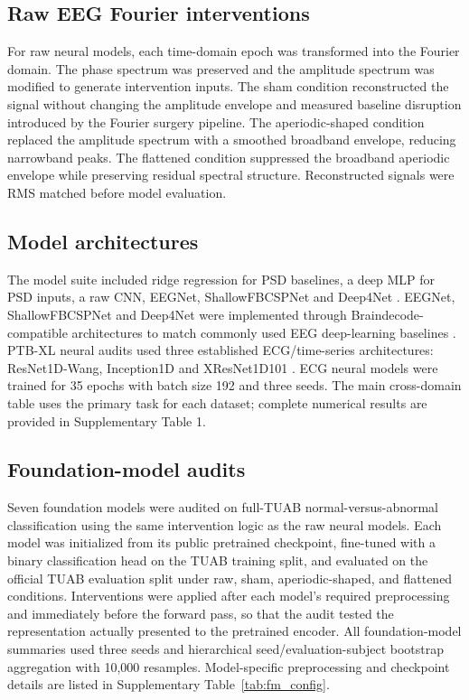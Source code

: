 \documentclass[pdflatex,sn-nature]{sn-jnl}
\begin{document}
\subsection{Raw EEG Fourier interventions}

For raw neural models, each time-domain epoch was transformed into the Fourier domain. The phase spectrum was preserved and the amplitude spectrum was modified to generate intervention inputs. The sham condition reconstructed the signal without changing the amplitude envelope and measured baseline disruption introduced by the Fourier surgery pipeline. The aperiodic-shaped condition replaced the amplitude spectrum with a smoothed broadband envelope, reducing narrowband peaks. The flattened condition suppressed the broadband aperiodic envelope while preserving residual spectral structure. Reconstructed signals were RMS matched before model evaluation.

\subsection{Model architectures}

The model suite included ridge regression for PSD baselines, a deep MLP for PSD inputs, a raw CNN, EEGNet, ShallowFBCSPNet and Deep4Net \cite{pedregosa2011scikit,lawhern2018eegnet,schirrmeister2017deep}. EEGNet, ShallowFBCSPNet and Deep4Net were implemented through Braindecode-compatible architectures to match commonly used EEG deep-learning baselines \cite{schirrmeister2017deep,gemein2020machine}. PTB-XL neural audits used three established ECG/time-series architectures: ResNet1D-Wang, Inception1D and XResNet1D101 \cite{wang2017timeseries,fawaz2020inceptiontime}. ECG neural models were trained for 35 epochs with batch size 192 and three seeds. The main cross-domain table uses the primary task for each dataset; complete numerical results are provided in Supplementary Table 1.

\subsection{Foundation-model audits}

Seven foundation models were audited on full-TUAB normal-versus-abnormal classification using the same intervention logic as the raw neural models. Each model was initialized from its public pretrained checkpoint, fine-tuned with a binary classification head on the TUAB training split, and evaluated on the official TUAB evaluation split under raw, sham, aperiodic-shaped, and flattened conditions. Interventions were applied after each model's required preprocessing and immediately before the forward pass, so that the audit tested the representation actually presented to the pretrained encoder. All foundation-model summaries used three seeds and hierarchical seed/evaluation-subject bootstrap aggregation with 10,000 resamples. Model-specific preprocessing and checkpoint details are listed in Supplementary Table~\ref{tab:fm_config}.
\end{document}
